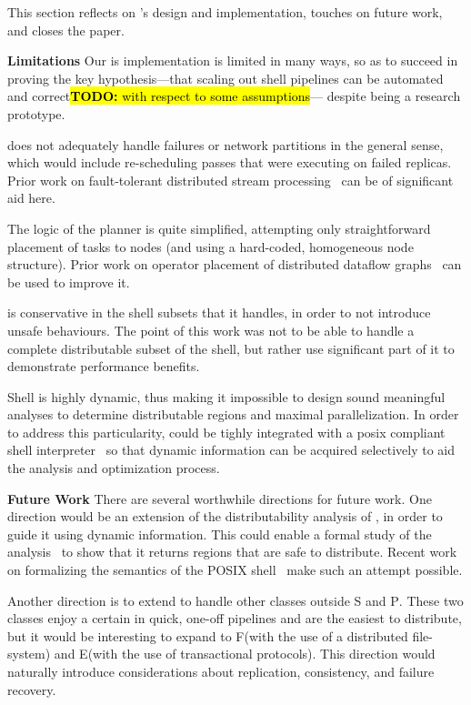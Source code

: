 \documentclass[sigplan,10pt,review,anonymous]{acmart}
\newcommand{\heading}[1]{\vspace{4pt}\noindent\textbf{#1}\enspace}
\newcommand{\cn}[1]{\mbox{\textcircled{\footnotesize #1}}}
\newcommand{\pur}{\cn{\textsc{P}}\xspace}
\newcommand{\sta}{\cn{\textsc{S}}\xspace}
\newcommand{\dfs}{\cn{\textsc{F}}\xspace}
\newcommand{\sid}{\cn{\textsc{E}}\xspace}
\newcommand{\TODO}[1]{\hl{\textbf{TODO:} #1}\xspace}
\begin{document}
This section reflects on \sys's design and implementation, touches on future work, and closes the paper.

\heading{Limitations}
Our is implementation is limited in many ways, so as to succeed in proving the key hypothesis---that scaling out shell pipelines can be automated and correct\TODO{with respect to some assumptions}--- despite \sys being a research prototype.

\sys does not adequately handle failures or network partitions in the general sense, which would include re-scheduling passes that were executing on failed replicas.
Prior work on fault-tolerant distributed stream processing~\cite{} can be of significant aid here.

The logic of the planner is quite simplified, attempting only straightforward placement of tasks to nodes (and using a hard-coded, homogeneous node structure).
Prior work on operator placement of distributed dataflow graphs~\cite{} can be used to improve it.

\sys is conservative in the shell subsets that it handles, in order to
not introduce unsafe behaviours. The point of this work was not to be
able to handle a complete distributable subset of the shell, but
rather use significant part of it to demonstrate performance benefits.

Shell is highly dynamic, thus making it impossible to design sound
meaningful analyses to determine distributable regions and maximal
parallelization. In order to address this particularity, \sys could be
tighly integrated with a posix compliant shell
interpreter~\cite{smoosh:20} so that dynamic information can be
acquired selectively to aid the analysis and optimization process.


\heading{Future Work}
There are several worthwhile directions for future work.  One
direction would be an extension of the distributability analysis of
\sys, in order to guide it using dynamic information. This could
enable a formal study of the analysis~ to show that it
returns regions that are safe to distribute.  Recent work on
formalizing the semantics of the POSIX shell~\cite{smoosh:20} make
such an attempt possible.

Another direction is to extend \sys to handle other classes outside \sta and \pur.
These two classes enjoy a certain in quick, one-off pipelines and are the easiest to distribute, but 
it would be interesting to expand to \dfs (with the use of a distributed file-system) and \sid (with the use of transactional protocols).
This direction would naturally introduce considerations about replication, consistency, and failure recovery.
\end{document}
